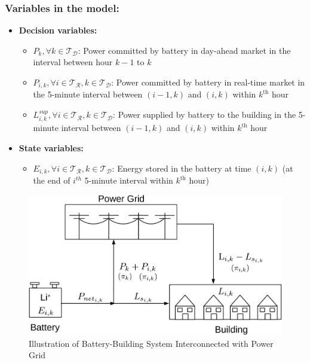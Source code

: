 \documentclass[11pt,twoside]{article}
\begin{document}
\subsubsection{Variables in the model:}
\begin{itemize}
\item \textbf{Decision variables:}
\begin{itemize}
\item[\textbullet] $P_{k}, \forall k \in \mathcal{T_D}$: Power committed by battery in day-ahead market in the interval between hour $k-1$ to $k$
\item[\textbullet] $P_{i,k}, \forall i \in \mathcal{T_R}, k \in \mathcal{T_D}$: Power committed by battery in real-time market in the 5-minute interval between $(i-1,k)$ and $(i,k)$ within $k^\text{th}$ hour
\item[\textbullet] $L^{sup}_{i,k}, \forall i \in \mathcal{T_R}, k \in \mathcal{T_D}$: Power supplied by battery to the building in the 5-minute interval between $(i-1,k)$ and $(i,k)$ within $k^\text{th}$ hour 
\end{itemize}
\item \textbf{State variables:}
\begin{itemize}
\item[\textbullet] $E_{i,k}, \forall i \in \mathcal{T_R}, k \in \mathcal{T_D}$: Energy stored in the battery at time $(i,k)$ (at the end of $i^{th}$ 5-minute interval within $k^\text{th}$ hour) 
\end{itemize}
\end{itemize}
\begin{figure}[h!]
\begin{center}
\includegraphics[scale=0.6]{Figures/system_blocks-crop.pdf} \caption{Illustration of Battery-Building System Interconnected with Power Grid}\label{fig:system}\end{center}
\end{figure}
\FloatBarrier
\end{document}
